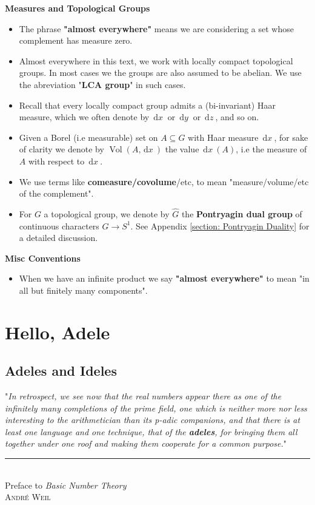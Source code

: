 \documentclass[11pt, x11names, openany]{book}
\renewcommand{\hat}{\widehat}
\newcommand{\dx}{\, \mathrm{d}x \ }
\newcommand{\dy}{\, \mathrm{d}y \ }
\newcommand{\dz}{\, \mathrm{d}z \ }
\DeclareMathOperator{\vol}{Vol}
\newenvironment{myquote}[3]
{
    \begin{flushright}
    \begin{adjustwidth}{0.125\textwidth}{}
    "\textit{#1}"\\
    \end{adjustwidth}
    \rule{.75\linewidth}{0.5pt}\\
    #2\\ \textsc{#3}

}
{
    \end{flushright}
}
\begin{document}
\textbf{Measures and Topological Groups}
\begin{itemize}
    \item The phrase \textbf{"almost everywhere"} means we are considering a set whose complement has measure zero.
    \item Almost everywhere in this text, we work with locally compact topological groups. In most cases we the groups are also assumed to be abelian. We use the abreviation "\textbf{LCA group}" in such cases.
    \item Recall that every locally compact group admits a (bi-invariant) Haar measure, which we often denote by $\dx$ or $\dy$ or $\dz$, and so on.
    \item Given a Borel (i.e measurable) set on $A \subseteq G$ with Haar measure $\dx$, for sake of clarity we denote by $\vol(A, \dx)$ the value $\dx(A)$, i.e the measure of $A$ with respect to $\dx$.
    \item We use terms like \textbf{comeasure/covolume}/etc, to mean "measure/volume/etc of the complement".
    \item For $G$ a topological group, we denote by $\hat{G}$ the \textbf{Pontryagin dual group} of continuous characters $G \to S^1$. See Appendix \ref{section: Pontryagin Duality} for a detailed discussion.
\end{itemize}

\textbf{Misc Conventions}
\begin{itemize}
    \item When we have an infinite product we say \textbf{"almost everywhere"} to mean "in all but finitely many components".
\end{itemize}



\chapter{Hello, Adele}
\label{chapter: Hello, Adele}


\section{Adeles and Ideles}
\label{section: Adeles&Ideles}

\begin{myquote}{In retrospect, we see now that the real numbers appear there as one of the infinitely many completions of the prime field, one which is neither more nor less interesting to the arithmetician than its p-adic companions, and that there is at least one language and one technique, that of the \textbf{adeles}, for bringing them all together under one roof and making them cooperate for a common purpose.}{Preface to \textit{Basic Number Theory}}{Andr\'e Weil}

\end{myquote}
\end{document}
